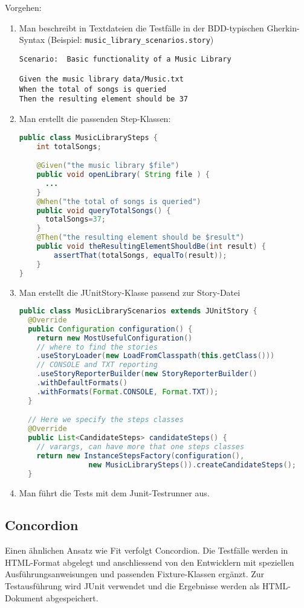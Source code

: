 Vorgehen:
\begin{enumerate}
\item Man beschreibt in Textdateien die Testfälle in der
BDD-typischen Gherkin-Syntax
  (Beispiel: \lstinline{music_library_scenarios.story})
\begin{lstlisting}[morekeywords={Given, When, And, Then}]
Scenario:  Basic functionality of a Music Library

Given the music library data/Music.txt
When the total of songs is queried
Then the resulting element should be 37
\end{lstlisting}
\newslide
\item Man erstellt die passenden Step-Klassen:
  \begin{lstlisting}[language=java]
public class MusicLibrarySteps {
    int totalSongs;

    @Given("the music library $file")
    public void openLibrary( String file ) {
      ...
    }
    @When("the total of songs is queried")
    public void queryTotalSongs() {
      totalSongs=37;
    }
    @Then("the resulting element should be $result")
    public void theResultingElementShouldBe(int result) {
    	assertThat(totalSongs, equalTo(result));
    }
}
  \end{lstlisting}
\item Man erstellt die JUnitStory-Klasse passend zur Story-Datei
  \begin{lstlisting}[language=java]
public class MusicLibraryScenarios extends JUnitStory {
  @Override
  public Configuration configuration() {
    return new MostUsefulConfiguration()
    // where to find the stories
    .useStoryLoader(new LoadFromClasspath(this.getClass()))
    // CONSOLE and TXT reporting
    .useStoryReporterBuilder(new StoryReporterBuilder()
    .withDefaultFormats()
    .withFormats(Format.CONSOLE, Format.TXT));
  }

  // Here we specify the steps classes
  @Override
  public List<CandidateSteps> candidateSteps() {
    // varargs, can have more that one steps classes
    return new InstanceStepsFactory(configuration(),
                new MusicLibrarySteps()).createCandidateSteps();
  }
  \end{lstlisting}
\item Man führt die Tests mit dem Junit-Testrunner aus.
\end{enumerate}
\newslide
\subsection{Concordion}
Einen ähnlichen Ansatz wie Fit verfolgt Concordion. Die Testfälle
werden in HTML-Format abgelegt und anschliessend von den
Entwicklern mit speziellen Ausführungsanweisungen und
passenden Fixture-Klassen ergänzt. Zur Testausführung wird
JUnit verwendet und die Ergebnisse werden als HTML-Dokument abgespeichert.

